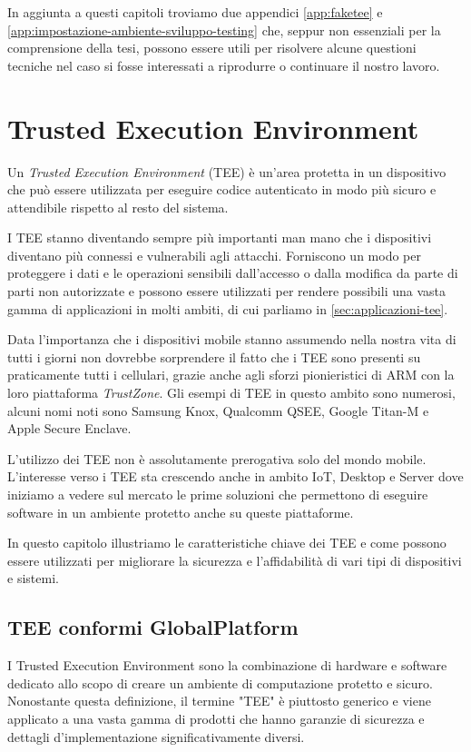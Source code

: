 \documentclass[12pt,italian]{report}
\begin{document}
In aggiunta a questi capitoli troviamo due appendici \ref{app:faketee} e
\ref{app:impostazione-ambiente-sviluppo-testing} che, seppur non essenziali
per la comprensione della tesi,
possono essere utili per risolvere alcune questioni tecniche
nel caso si fosse interessati a riprodurre o continuare il nostro lavoro.

\chapter{Trusted Execution Environment}
\label{chap:tee}
Un \textit{Trusted Execution Environment} (TEE) è un'area protetta in un
dispositivo che può essere utilizzata per eseguire codice autenticato in modo
più sicuro e attendibile rispetto al resto del sistema.

I TEE stanno diventando sempre più importanti man mano che i dispositivi
diventano più connessi e vulnerabili agli attacchi.
Forniscono un modo per proteggere i dati e le operazioni sensibili
dall'accesso o dalla modifica da parte di parti non autorizzate e possono
essere utilizzati per rendere possibili una vasta gamma di applicazioni
in molti ambiti, di cui parliamo in \ref{sec:applicazioni-tee}.

Data l'importanza che i dispositivi mobile stanno assumendo nella nostra
vita di tutti i giorni non dovrebbe sorprendere il fatto che i TEE sono
presenti su praticamente tutti i cellulari, grazie anche agli sforzi
pionieristici di ARM con la loro piattaforma \textit{TrustZone}.
Gli esempi di TEE in questo ambito sono numerosi, alcuni nomi noti sono
Samsung Knox, Qualcomm QSEE, Google Titan-M e Apple Secure Enclave.

L'utilizzo dei TEE non è assolutamente prerogativa solo del mondo mobile.
L'interesse verso i TEE sta crescendo anche in ambito IoT, Desktop e Server 
dove iniziamo a vedere sul mercato le prime soluzioni che permettono di
eseguire software in un ambiente protetto anche su queste piattaforme.

In questo capitolo illustriamo le caratteristiche chiave dei TEE e come
possono essere utilizzati per migliorare la sicurezza e l'affidabilità di
vari tipi di dispositivi e sistemi.

\section{TEE conformi GlobalPlatform}
\label{sec:tee-conformi-globalplatform}
I Trusted Execution Environment sono la combinazione di hardware e software
dedicato allo scopo di creare un ambiente di computazione protetto e sicuro.
Nonostante questa definizione, il termine "TEE" è piuttosto generico
e viene applicato a una vasta gamma di prodotti che hanno garanzie di sicurezza
e dettagli d'implementazione significativamente diversi.
\end{document}
